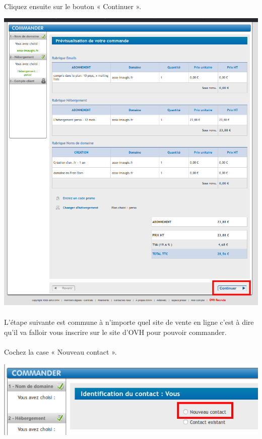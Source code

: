 \documentclass[10pt,a4paper]{article}
\begin{document}
\paragraph{}Cliquez ensuite sur le bouton « Continuer ».
\begin{center}
\includegraphics[scale=0.3]{img/0278.png}
\end{center}
\newpage
\paragraph{}L'étape suivante est commune à n'importe quel site de vente en ligne c'est à dire qu'il va falloir vous inscrire sur le site d'OVH pour pouvoir commander.
\paragraph{}Cochez la case « Nouveau contact ».
\begin{center}
\includegraphics[scale=0.25]{img/0279.png}
\end{center}
\end{document}
